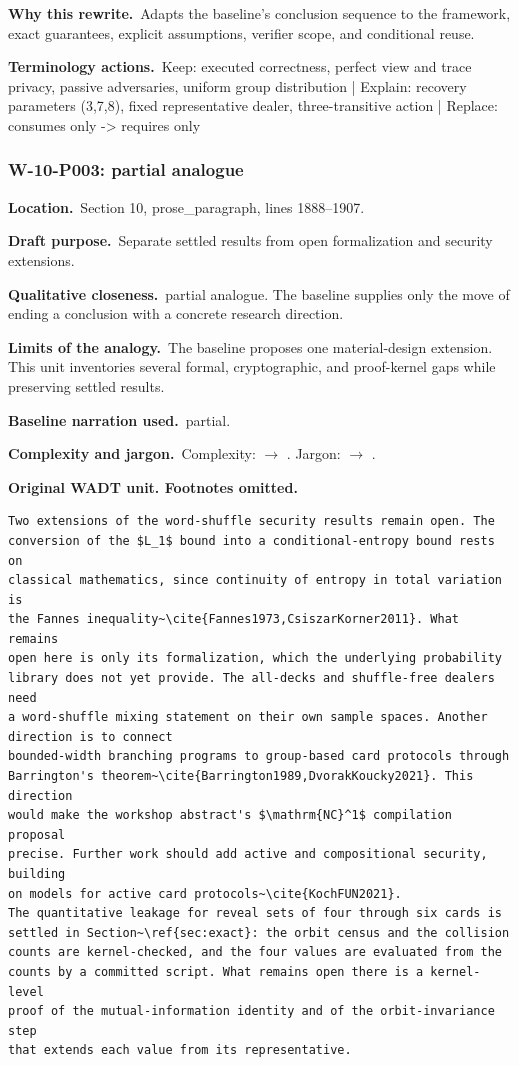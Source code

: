 \documentclass[10pt]{article}
\renewcommand{\cite}[1]{\textnormal{[\texttt{\detokenize{#1}}]}}\renewcommand{\label}[1]{}
\newcommand{\Field}[2]{\textbf{#1}\ #2\par}\newcommand{\Tag}[1]{\fcolorbox{black!25}{black!4}{\strut\scriptsize #1}}
\begin{document}
\Field{Why this rewrite.}{Adapts the baseline's conclusion sequence to the framework, exact guarantees, explicit assumptions, verifier scope, and conditional reuse.}
\Field{Terminology actions.}{Keep: executed correctness, perfect view and trace privacy, passive adversaries, uniform group distribution | Explain: recovery parameters (3,7,8), fixed representative dealer, three-transitive action | Replace: consumes only -> requires only}
\par\smallskip
{}\subsubsection*{W-10-P003: partial analogue}
\Field{Location.}{Section 10, prose\_paragraph, lines 1888--1907.}
\Field{Draft purpose.}{Separate settled results from open formalization and security extensions.}
\Field{Qualitative closeness.}{partial analogue. The baseline supplies only the move of ending a conclusion with a concrete research direction.}
\Field{Limits of the analogy.}{The baseline proposes one material-design extension. This unit inventories several formal, cryptographic, and proof-kernel gaps while preserving settled results.}
\Field{Baseline narration used.}{partial.}
\Field{Complexity and jargon.}{Complexity: \Tag{high} $\rightarrow$ \Tag{medium}. Jargon: \Tag{high} $\rightarrow$ \Tag{medium}.}
\textbf{Original WADT unit. Footnotes omitted.}
\begin{lstlisting}
Two extensions of the word-shuffle security results remain open. The
conversion of the $L_1$ bound into a conditional-entropy bound rests on
classical mathematics, since continuity of entropy in total variation is
the Fannes inequality~\cite{Fannes1973,CsiszarKorner2011}. What remains
open here is only its formalization, which the underlying probability
library does not yet provide. The all-decks and shuffle-free dealers need
a word-shuffle mixing statement on their own sample spaces. Another
direction is to connect
bounded-width branching programs to group-based card protocols through
Barrington's theorem~\cite{Barrington1989,DvorakKoucky2021}. This direction
would make the workshop abstract's $\mathrm{NC}^1$ compilation proposal
precise. Further work should add active and compositional security, building
on models for active card protocols~\cite{KochFUN2021}.
The quantitative leakage for reveal sets of four through six cards is
settled in Section~\ref{sec:exact}: the orbit census and the collision
counts are kernel-checked, and the four values are evaluated from the
counts by a committed script. What remains open there is a kernel-level
proof of the mutual-information identity and of the orbit-invariance step
that extends each value from its representative.
\end{lstlisting}
\end{document}
